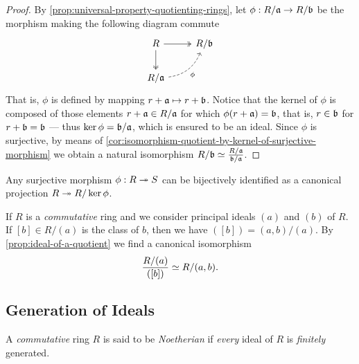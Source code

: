 \begin{proof}
    By \cref{prop:universal-property-quotienting-rings}, let
    \(\phi: R/\mathfrak{a} \to R/\mathfrak{b}\) be the morphism making the following
    diagram commute
    \[
        \begin{tikzcd}
            R \ar[r, two heads] \ar[d, two heads] & R/\ideal{b} \\
            R/\ideal{a} \ar[ru, dashed, bend right, "\phi"'] &
        \end{tikzcd}
    \]
    That is, \(\phi\) is defined by mapping \(r + \mathfrak{a} \mapsto r +
    \mathfrak{b}\). Notice that the kernel of \(\phi\) is composed of those elements
    \(r + \mathfrak{a} \in R/\mathfrak{a}\) for which \(\phi(r + \mathfrak{a}) = \mathfrak{b}\),
    that is, \(r \in \mathfrak{b}\) for \(r + \mathfrak{b} = \mathfrak{b}\) --- thus
    \(\ker \phi = \mathfrak{b}/\mathfrak{a}\), which is ensured to be an ideal. Since
    \(\phi\) is surjective, by means of
    \cref{cor:isomorphism-quotient-by-kernel-of-surjective-morphism} we obtain a
    natural isomorphism \(R/\mathfrak{b} \simeq \frac{R/\mathfrak{a}}{\mathfrak{b}/\mathfrak{a}}\).
\end{proof}

\begin{corollary}
    \label{cor:surjective-is-projection-into-quotient}
    Any surjective morphism \(\phi: R \twoheadrightarrow S\) can be bijectively identified as a
    canonical projection \(R \twoheadrightarrow R/\ker \phi\).
\end{corollary}

\begin{example}
    \label{exp:principal-ideals-and-ideals-of-a-quotient}
    If \(R\) is a \emph{commutative} ring and we consider principal ideals \((a)\)
    and \((b)\) of \(R\). If \([b] \in R/(a)\) is the class of \(b\), then we have
    \(([b]) = (a, b) / (a)\). By \cref{prop:ideal-of-a-quotient} we find a
    canonical isomorphism
    \[
        \frac{R/(a)}{([b])} \simeq R/(a, b).
    \]
\end{example}

\subsection{Generation of Ideals}

\begin{definition}
    \label{def:noetherian-ring}
    A \emph{commutative} ring \(R\) is said to be \emph{Noetherian} if \emph{every}
    ideal of \(R\) is \emph{finitely} generated.
\end{definition}

